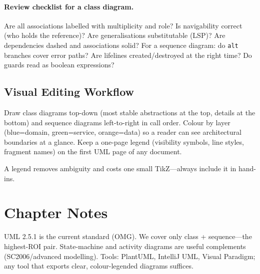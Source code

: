 \paragraph{Review checklist for a class diagram.} Are all associations labelled with multiplicity and role? Is navigability correct (who holds the reference)? Are generalisations substitutable (LSP)? Are dependencies dashed and associations solid? For a sequence diagram: do \texttt{alt} branches cover error paths? Are lifelines created/destroyed at the right time? Do guards read as boolean expressions?

\subsection{Visual Editing Workflow}
Draw class diagrams top-down (most stable abstractions at the top, details at the bottom) and sequence diagrams left-to-right in call order. Colour by layer (blue=domain, green=service, orange=data) so a reader can see architectural boundaries at a glance. Keep a one-page legend (visibility symbols, line styles, fragment names) on the first UML page of any document.

\begin{center}
\end{center}
A legend removes ambiguity and costs one small TikZ---always include it in hand-ins.

\section{Chapter Notes}
UML 2.5.1 is the current standard (OMG). We cover only class + sequence---the highest-ROI pair. State-machine and activity diagrams are useful complements (SC2006/advanced modelling). Tools: PlantUML, IntelliJ UML, Visual Paradigm; any tool that exports clear, colour-legended diagrams suffices.

